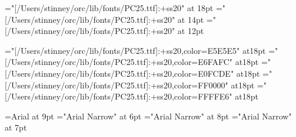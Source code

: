 
\let\everymathextra\relax
\let\preamble\relax


\let\seq\relax
\let\lname\relax
\let\sname\relax
\let\uname\relax
\let\chars\relax
\let\names\relax
\let\glyph\relax
\let\rglyf\relax
\let\image\relax
\let\notes\relax
\let\stags\relax

\let\sqdbcun\relax
\let\sqdbpua\relax
\let\sqseq\relax
\let\sqinv\relax
\let\sqchr\relax

\let\imagefloat\relax
\let\imagecaption\relax

\let\remfor\relax
\let\Hhhhh\relax

\let\ofspc\pcxxv

\def\unames{\eight\rm}

\def\ofs#1#2#3{}
\let\ofspc\pcxxv

\font\pcssXX="[/Users/stinney/orc/lib/fonts/PC25.ttf]:+ss20" at 18pt
\font\pcssxx="[/Users/stinney/orc/lib/fonts/PC25.ttf]:+ss20" at 14pt
\font\pcssxxx="[/Users/stinney/orc/lib/fonts/PC25.ttf]:+ss20" at 12pt

\font\pceee="[/Users/stinney/orc/lib/fonts/PC25.ttf]:+ss20,color=E5E5E5" at18pt
\font\pceff="[/Users/stinney/orc/lib/fonts/PC25.ttf]:+ss20,color=E6FAFC" at18pt
\font\pcefd="[/Users/stinney/orc/lib/fonts/PC25.ttf]:+ss20,color=E0FCDE" at18pt
\font\pcfee="[/Users/stinney/orc/lib/fonts/PC25.ttf]:+ss20,color=FF0000" at18pt
\font\pcffe="[/Users/stinney/orc/lib/fonts/PC25.ttf]:+ss20,color=FFFFE6" at18pt

\let\redpc\pcfee

\font\helv=Arial at 9pt
\font\helvx="Arial Narrow" at 6pt
\font\helvy="Arial Narrow" at 8pt
\font\helvz="Arial Narrow" at 7pt

\def\ccchr{\pcssxx}
\def\ccuni{\helvx}

\def\beginchartlist{\newpage\begin{2column}\offinterlineskip} %
\def\endchartlist{\end{2column}}

\def\cclrow#1#2#3{%
        \vbox{\hsize3.2in\parindent0pt
              \hbox to 3.2in{%
              \hbox to .4in{\helvy#1\hfil}%
              \hbox to .4in{\pcssxx#2\hss}%
              \hbox to 2.4in{\hsize2.4in\vtop{\par\helvy\leavevmode\rightskip0pt plus1fil\relax#3\endgraf}}%
                            \hfil}}\vfil}
\def\cclnum#1{{\helv#1}}
\def\cclchr{\redpc}%
\def\ccluni{\Sans\eight\rm}

